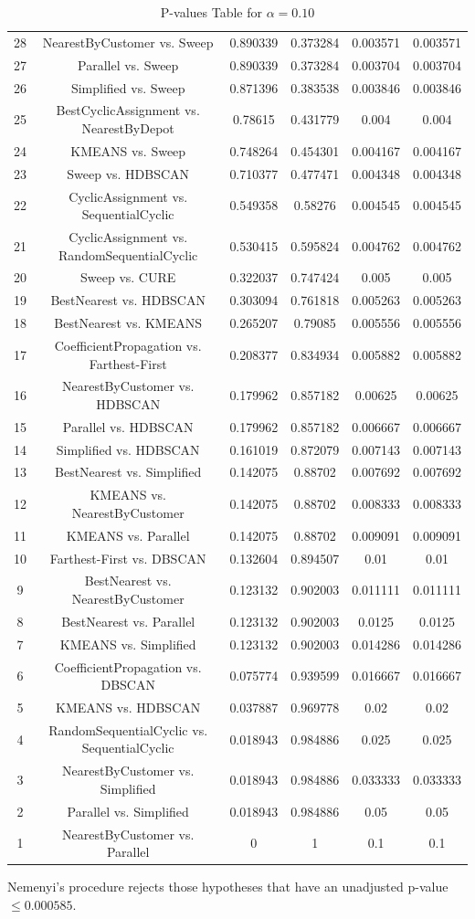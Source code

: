 \documentclass[a4paper,10pt]{article}
\begin{document}
\begin{landscape}
\begin{table}[!htp]
\begin{tabular}{cccccc}
28&NearestByCustomer vs. Sweep&0.890339&0.373284&0.003571&0.003571\\
27&Parallel vs. Sweep&0.890339&0.373284&0.003704&0.003704\\
26&Simplified vs. Sweep&0.871396&0.383538&0.003846&0.003846\\
25&BestCyclicAssignment vs. NearestByDepot&0.78615&0.431779&0.004&0.004\\
24&KMEANS vs. Sweep&0.748264&0.454301&0.004167&0.004167\\
23&Sweep vs. HDBSCAN&0.710377&0.477471&0.004348&0.004348\\
22&CyclicAssignment vs. SequentialCyclic&0.549358&0.58276&0.004545&0.004545\\
21&CyclicAssignment vs. RandomSequentialCyclic&0.530415&0.595824&0.004762&0.004762\\
20&Sweep vs. CURE&0.322037&0.747424&0.005&0.005\\
19&BestNearest vs. HDBSCAN&0.303094&0.761818&0.005263&0.005263\\
18&BestNearest vs. KMEANS&0.265207&0.79085&0.005556&0.005556\\
17&CoefficientPropagation vs. Farthest-First&0.208377&0.834934&0.005882&0.005882\\
16&NearestByCustomer vs. HDBSCAN&0.179962&0.857182&0.00625&0.00625\\
15&Parallel vs. HDBSCAN&0.179962&0.857182&0.006667&0.006667\\
14&Simplified vs. HDBSCAN&0.161019&0.872079&0.007143&0.007143\\
13&BestNearest vs. Simplified&0.142075&0.88702&0.007692&0.007692\\
12&KMEANS vs. NearestByCustomer&0.142075&0.88702&0.008333&0.008333\\
11&KMEANS vs. Parallel&0.142075&0.88702&0.009091&0.009091\\
10&Farthest-First vs. DBSCAN&0.132604&0.894507&0.01&0.01\\
9&BestNearest vs. NearestByCustomer&0.123132&0.902003&0.011111&0.011111\\
8&BestNearest vs. Parallel&0.123132&0.902003&0.0125&0.0125\\
7&KMEANS vs. Simplified&0.123132&0.902003&0.014286&0.014286\\
6&CoefficientPropagation vs. DBSCAN&0.075774&0.939599&0.016667&0.016667\\
5&KMEANS vs. HDBSCAN&0.037887&0.969778&0.02&0.02\\
4&RandomSequentialCyclic vs. SequentialCyclic&0.018943&0.984886&0.025&0.025\\
3&NearestByCustomer vs. Simplified&0.018943&0.984886&0.033333&0.033333\\
2&Parallel vs. Simplified&0.018943&0.984886&0.05&0.05\\
1&NearestByCustomer vs. Parallel&0&1&0.1&0.1\\
\hline
\end{tabular}
\caption{P-values Table for $\alpha=0.10$}
\end{table}Nemenyi's procedure rejects those hypotheses that have an unadjusted p-value $\le0.000585$.


\end{landscape}
\end{document}
